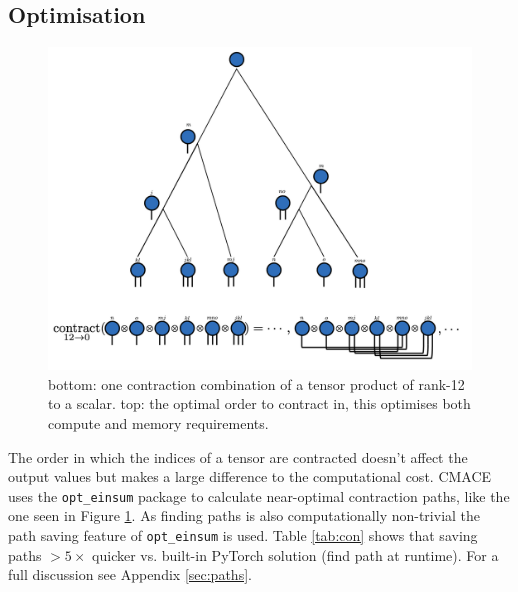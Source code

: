 \subsection{Optimisation}

\begin{figure}[H]
    \centering
    \includegraphics[scale=0.4]{figures/con-tree.png}
    \caption{bottom: one contraction combination of a tensor product of rank-12 to a scalar. top: the optimal order to contract in, this optimises both compute and memory requirements.}
    \label{fig:con-tree}
\end{figure}

The order in which the indices of a tensor are contracted doesn't affect the output values but makes a large difference to the computational cost. CMACE uses the \texttt{opt\_einsum} package to calculate near-optimal contraction paths, like the one seen in Figure \ref{fig:con-tree}. As finding paths is also computationally non-trivial the path saving feature of \texttt{opt\_einsum} is used. Table \ref{tab:con} shows that saving paths $>5 \times$ quicker vs. built-in PyTorch solution (find path at runtime). For a full discussion see Appendix \ref{sec:paths}.

